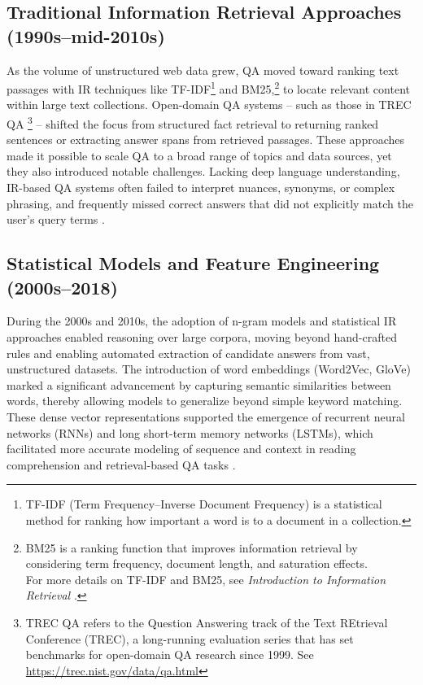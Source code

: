\begin{spacing}{1.5}
\subsection{Traditional Information Retrieval Approaches (1990s–mid-2010s)}
As the volume of unstructured web data grew, QA moved toward ranking text passages with IR techniques like TF-IDF\footnote{TF-IDF (Term Frequency–Inverse Document Frequency) is a statistical method for ranking how important a word is to a document in a collection.} and BM25,\footnote{BM25 is a ranking function that improves information retrieval by considering term frequency, document length, and saturation effects.\\For more details on TF-IDF and BM25, see \textit{Introduction to Information Retrieval} \citep{manning_introduction_2008}.} to locate relevant content within large text collections. Open-domain QA systems -- such as those in TREC QA \citep{hirschman_natural_2001}\footnote{TREC QA refers to the Question Answering track of the Text REtrieval Conference (TREC), a long-running evaluation series that has set benchmarks for open-domain QA research since 1999. See \url{https://trec.nist.gov/data/qa.html}} -- shifted the focus from structured fact retrieval to returning ranked sentences or extracting answer spans from retrieved passages. These approaches made it possible to scale QA to a broad range of topics and data sources, yet they also introduced notable challenges. Lacking deep language understanding, IR-based QA systems often failed to interpret nuances, synonyms, or complex phrasing, and frequently missed correct answers that did not explicitly match the user’s query terms \citep{antoniou_survey_2022, caballero_brief_2021}.

\subsection{Statistical Models and Feature Engineering (2000s–2018)}
During the 2000s and 2010s, the adoption of n-gram models and statistical IR approaches enabled reasoning over large corpora, moving beyond hand-crafted rules and enabling automated extraction of candidate answers from vast, unstructured datasets. The introduction of word embeddings (Word2Vec, GloVe) marked a significant advancement by capturing semantic similarities between words, thereby allowing models to generalize beyond simple keyword matching. These dense vector representations supported the emergence of recurrent neural networks (RNNs) and long short-term memory networks (LSTMs), which facilitated more accurate modeling of sequence and context in reading comprehension and retrieval-based QA tasks \citep{jurafsky_chapter_2024}. 


\end{spacing}
